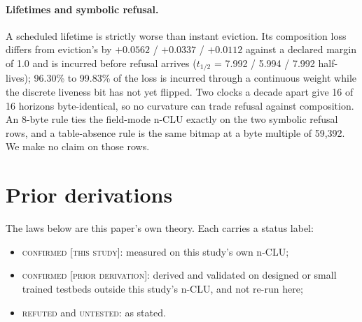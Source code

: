 \documentclass{article} %
\begin{document}
\paragraph{Lifetimes and symbolic refusal.} A scheduled lifetime is strictly worse than instant
eviction. Its composition loss differs from eviction's by $+0.0562$ / $+0.0337$ / $+0.0112$ against a
declared margin of 1.0 and is incurred before refusal arrives ($t_{1/2}$ = 7.992 / 5.994 / %
7.992 half-lives); 96.30\% to 99.83\% of the loss is incurred through a continuous weight while the
discrete liveness bit has not yet flipped. %
Two clocks a decade apart give 16 of 16 horizons byte-identical, so no curvature can trade refusal
against composition. An 8-byte rule ties the field-mode n-CLU exactly on the two symbolic refusal rows,
and a table-absence rule is the same bitmap at a byte multiple of 59,392. We make no claim on those
rows. %

\section{Prior derivations}
\label{app:shorts}

The laws below are this paper's own theory. Each carries a status label:
\begin{itemize}
\item \textsc{confirmed [this study]}: measured on this study's own n-CLU;
\item \textsc{confirmed [prior derivation]}: derived and validated on designed or small trained
  testbeds outside this study's n-CLU, and not re-run here;
\item \textsc{refuted} and \textsc{untested}: as stated.
\end{itemize}
\end{document}
